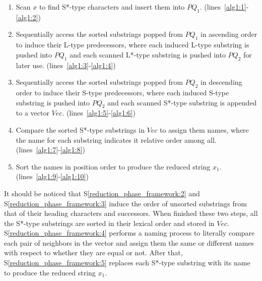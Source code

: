 \documentclass[10pt,journal,compsoc]{IEEEtran}
\begin{document}
\begin{enumerate}[S1]

\item Scan $x$ to find S*-type characters and insert them into $PQ_1$. (lines~\ref{alg1:1}-\ref{alg1:2}) \label{reduction_phase_framework:1}

\item Sequentially access the sorted substrings popped from $PQ_1$ in ascending order to induce their L-type predecessors, where each induced L-type substring is pushed into $PQ_1$ and each scanned L*-type substring is pushed into $PQ_2$ for later use. (lines~\ref{alg1:3}-\ref{alg1:4}) \label{reduction_phase_framework:2}

\item Sequentially access the sorted substrings popped from $PQ_2$ in descending order to induce their S-type predecessors, where each induced S-type substring is pushed into $PQ_2$ and each scanned S*-type substring is appended to a vector $Vec$. (lines~\ref{alg1:5}-\ref{alg1:6}) \label{reduction_phase_framework:3}

\item Compare the sorted S*-type substrings in $Vec$ to assign them names, where the name for each substring indicates it relative order among all. (lines~\ref{alg1:7}-\ref{alg1:8}) \label{reduction_phase_framework:4}

\item Sort the names in position order to produce the reduced string $x_1$. (lines~\ref{alg1:9}-\ref{alg1:10}) \label{reduction_phase_framework:5}

\end{enumerate}

It should be noticed that S\ref{reduction_phase_framework:2} and S\ref{reduction_phase_framework:3} induce the order of unsorted substrings from that of their heading characters and successors. When finished these two steps, all the S*-type substrings are sorted in their lexical order and stored in $Vec$. S\ref{reduction_phase_framework:4} performs a naming process to literally compare each pair of neighbors in the vector and assign them the same or different names with respect to whether they are equal or not. After that, S\ref{reduction_phase_framework:5} replaces each S*-type substring with its name to produce the reduced string $x_1$. 
\end{document}
